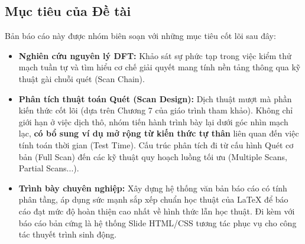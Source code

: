 \subsection{Mục tiêu của Đề tài}
Bản báo cáo này được nhóm biên soạn với những mục tiêu cốt lõi sau đây:
\begin{itemize}
    \item \textbf{Nghiên cứu nguyên lý DFT:} Khảo sát sự phức tạp trong việc kiểm thử mạch tuần tự và tìm hiểu cơ chế giải quyết mang tính nền tảng thông qua kỹ thuật gài chuỗi quét (Scan Chain).
    \item \textbf{Phân tích thuật toán Quét (Scan Design):} Dịch thuật mượt mà phần kiến thức cốt lõi (dựa trên Chương 7 của giáo trình tham khảo). Không chỉ giới hạn ở việc dịch thô, nhóm tiến hành trình bày lại dưới góc nhìn mạch lạc, \textbf{có bổ sung ví dụ mở rộng từ kiến thức tự thân} liên quan đến việc tính toán thời gian (Test Time). Cấu trúc phân tích đi từ cấu hình Quét cơ bản (Full Scan) đến các kỹ thuật quy hoạch luồng tối ưu (Multiple Scans, Partial Scans...).
    \item \textbf{Trình bày chuyên nghiệp:} Xây dựng hệ thống văn bản báo cáo có tính phân tầng, áp dụng sức mạnh sắp xếp chuẩn học thuật của LaTeX để báo cáo đạt mức độ hoàn thiện cao nhất về hình thức lẫn học thuật. Đi kèm với báo cáo bản cứng là hệ thống Slide HTML/CSS tương tác phục vụ cho công tác thuyết trình sinh động.
\end{itemize}

